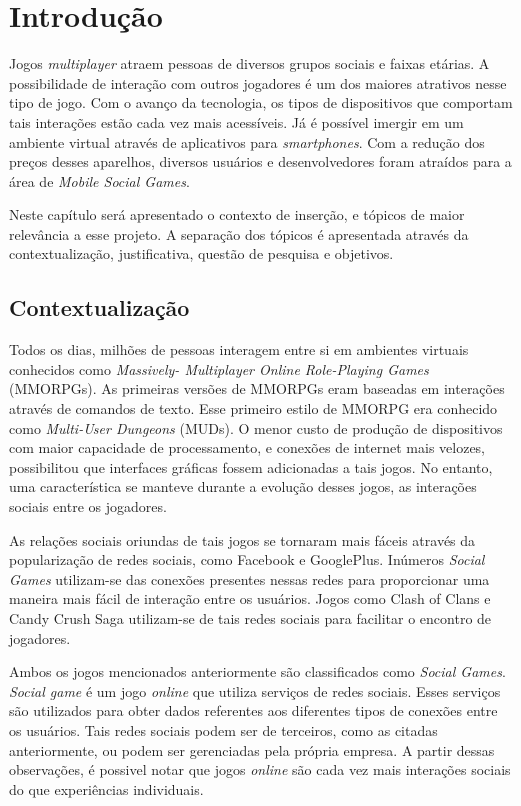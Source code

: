 \chapter[Introdução]{Introdução}

Jogos \textit{multiplayer} atraem pessoas de diversos grupos sociais e faixas etárias. A possibilidade de interação com outros jogadores
é um dos maiores atrativos nesse tipo de jogo. Com o avanço da tecnologia, os tipos de dispositivos que comportam tais interações
estão cada vez mais acessíveis. Já é possível imergir em um ambiente virtual através de aplicativos para \textit{smartphones}. Com a
redução dos preços desses aparelhos, diversos usuários e desenvolvedores foram atraídos para a área de \textit{Mobile Social Games}.

Neste capítulo será apresentado o contexto de inserção, e tópicos de maior
relevância a esse projeto. A separação dos tópicos é apresentada através da
contextualização, justificativa, questão de pesquisa e objetivos.


\section{Contextualização}

Todos os dias, milhões de pessoas interagem entre si em ambientes virtuais conhecidos como
\textit{Massively- Multiplayer Online Role-Playing Games} (MMORPGs)\cite{nick2006}. As primeiras versões de MMORPGs eram baseadas em
interações através de comandos de texto. Esse primeiro estilo de MMORPG era conhecido como \textit{Multi-User Dungeons} (MUDs)\cite{edward1997}.
O menor custo de produção de dispositivos com maior capacidade de processamento, e conexões de internet mais velozes,
possibilitou que interfaces gráficas fossem adicionadas a tais jogos. No entanto, uma característica se manteve durante a evolução desses jogos,
as interações sociais entre os jogadores.

As relações sociais oriundas de tais jogos se tornaram mais fáceis através da popularização de redes sociais, como Facebook e GooglePlus.
Inúmeros \textit{Social Games} utilizam-se das conexões presentes nessas redes para proporcionar uma maneira mais fácil de interação entre
os usuários. Jogos como Clash of Clans\cite{clashOfClans} e Candy Crush Saga\cite{candyCrush} utilizam-se de tais redes sociais para facilitar
o encontro de jogadores.

Ambos os jogos mencionados anteriormente são classificados como \textit{Social Games}. \textit{Social game} é um jogo \textit{online} que utiliza servi\c{c}os de redes sociais\cite{park2012}.
Esses serviços são utilizados para obter dados referentes aos diferentes tipos de conexões entre os usuários. Tais redes sociais podem ser de terceiros,
como as citadas anteriormente, ou podem ser gerenciadas pela própria empresa. A partir dessas observações, é possivel notar que
jogos \textit{online} são cada vez mais interações sociais do que experi\^encias individuais\cite{king2003}.

